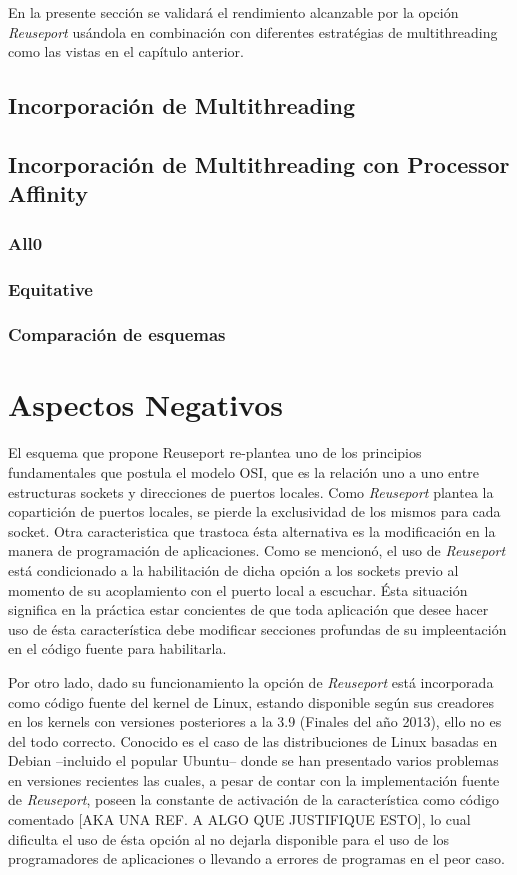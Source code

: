 En la presente sección se validará el rendimiento alcanzable por la opción \emph{Reuseport} usándola en combinación con diferentes estratégias de multithreading como las vistas en el capítulo anterior.

\subsection{Incorporación de Multithreading}

\subsection{Incorporación de Multithreading con Processor Affinity}

\subsubsection{All0}
\subsubsection{Equitative}
\subsubsection{Comparación de esquemas}


\section{Aspectos Negativos}

El esquema que propone Reuseport re-plantea uno de los principios fundamentales que postula el modelo OSI, que es la relación uno a uno entre estructuras sockets y direcciones de puertos locales. Como \emph{Reuseport} plantea la copartición de puertos locales, se pierde la exclusividad de los mismos para cada socket. Otra caracteristica que trastoca ésta alternativa es la modificación en la manera de programación de aplicaciones. Como se mencionó, el uso de \emph{Reuseport} está condicionado a la habilitación de dicha opción a los sockets previo al momento de su acoplamiento con el puerto local a escuchar. Ésta situación significa en la práctica estar concientes de que toda aplicación que desee hacer uso de ésta característica debe modificar secciones profundas de su impleentación en el código fuente para habilitarla.

Por otro lado, dado su funcionamiento la opción de \emph{Reuseport} está incorporada como código fuente del kernel de Linux, estando disponible según sus creadores en los kernels con versiones posteriores a la 3.9 (Finales del año 2013), ello no es del todo correcto. Conocido es el caso de las distribuciones de Linux basadas en Debian --incluido el popular Ubuntu-- donde se han presentado varios problemas en versiones recientes las cuales, a pesar de contar con la implementación fuente de \emph{Reuseport}, poseen la constante de activación de la característica como código comentado [AKA UNA REF. A ALGO QUE JUSTIFIQUE ESTO], lo cual dificulta el uso de ésta opción al no dejarla disponible para el uso de los programadores de aplicaciones o llevando a errores de programas en el peor caso.

